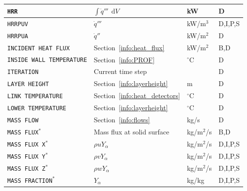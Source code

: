 \documentclass[11pt]{book}
\newcommand{\ct}{\tt\small}
\renewcommand{\d}{\,\mathrm{d}}
\newcommand{\dq}{\dot{q}}
\begin{document}
\begin{longtable}{@{\extracolsep{\fill}}|l|l|l|l|}
{\ct HRR}                                       & $\int \dq''' \; \d V$                           & kW             & D            \\ \hline
{\ct HRRPUV}                                    & $\dq'''$                                      & kW/m$^3$       & D,I,P,S      \\ \hline
{\ct HRRPUA}                                    & $\dq''$                                       & kW/m$^2$       & D            \\ \hline
{\ct INCIDENT HEAT FLUX}                        & Section~\ref{info:heat_flux}                  & kW/m$^2$       & B,D          \\ \hline
{\ct INSIDE WALL TEMPERATURE}                   & Section~\ref{info:PROF}                       & $^\circ$C      & D            \\ \hline
{\ct ITERATION}                                 & Current time step                             &                & D            \\ \hline
{\ct LAYER HEIGHT}                              & Section~\ref{info:layerheight}                & m              & D            \\ \hline
{\ct LINK TEMPERATURE}                          & Section~\ref{info:heat_detectors}             & $^\circ$C      & D            \\ \hline
{\ct LOWER TEMPERATURE}                         & Section~\ref{info:layerheight}                & $^\circ$C      & D            \\ \hline
{\ct MASS FLOW}                                 & Section~\ref{info:flows}                      & kg/s           & D            \\ \hline
{\ct MASS FLUX}$^*$                             & Mass flux at solid surface                    & kg/m$^2$/s     & B,D          \\ \hline
{\ct MASS FLUX X}$^*$                           & $\rho u Y_\alpha$                             & kg/m$^2$/s     & D,I,P,S      \\ \hline
{\ct MASS FLUX Y}$^*$                           & $\rho v Y_\alpha$                             & kg/m$^2$/s     & D,I,P,S      \\ \hline
{\ct MASS FLUX Z}$^*$                           & $\rho w Y_\alpha$                             & kg/m$^2$/s     & D,I,P,S      \\ \hline
{\ct MASS FRACTION}$^*$                         & $Y_\alpha$                                    & kg/kg          & D,I,P,S      \\ \hline

\end{longtable}
\end{document}
